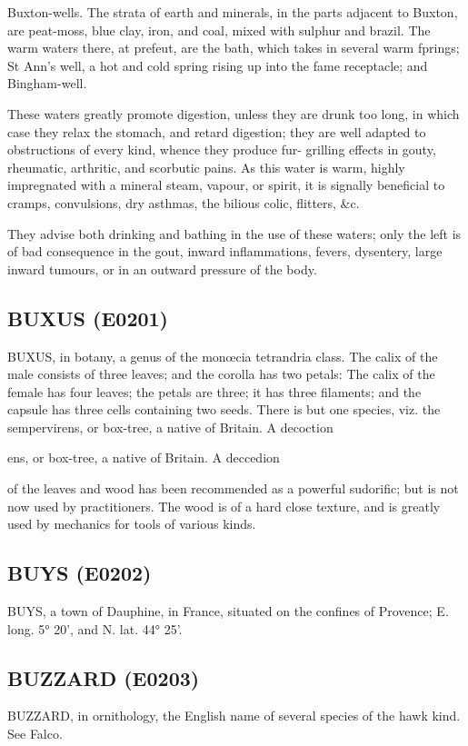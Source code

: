 \documentclass{article}
\begin{document}
Buxton-wells. The strata of earth and minerals, in the parts adjacent to Buxton, are peat-moss, blue clay, iron, and coal, mixed with sulphur and brazil. The warm waters there, at prefeut, are the bath, which takes in several warm fprings; St Ann's well, a hot and cold spring rising up into the fame receptacle; and Bingham-well.

These waters greatly promote digestion, unless they are drunk too long, in which case they relax the stomach, and retard digestion; they are well adapted to obstructions of every kind, whence they produce fur- grilling effects in gouty, rheumatic, arthritic, and scorbutic pains. As this water is warm, highly impregnated with a mineral steam, vapour, or spirit, it is signally beneficial to cramps, convulsions, dry asthmas, the bilious colic, flitters, \&c.

They advise both drinking and bathing in the use of these waters; only the left is of bad consequence in the gout, inward inflammations, fevers, dysentery, large inward tumours, or in an outward pressure of the body.

\subsection*{BUXUS (E0201)}
BUXUS, in botany, a genus of the monœcia tetrandria class. The calix of the male consists of three leaves; and the corolla has two petals: The calix of the female has four leaves; the petals are three; it has three filaments; and the capsule has three cells containing two seeds. There is but one species, viz. the sempervirens, or box-tree, a native of Britain. A decoction

ens, or box-tree, a native of Britain. A deccedion

of the leaves and wood has been recommended as a powerful sudorific; but is not now used by practitioners. The wood is of a hard close texture, and is greatly used by mechanics for tools of various kinds.

\subsection*{BUYS (E0202)}
BUYS, a town of Dauphine, in France, situated on the confines of Provence; E. long. 5° 20', and N. lat. 44° 25'.

\subsection*{BUZZARD (E0203)}
BUZZARD, in ornithology, the English name of several species of the hawk kind. See Falco.
\end{document}
